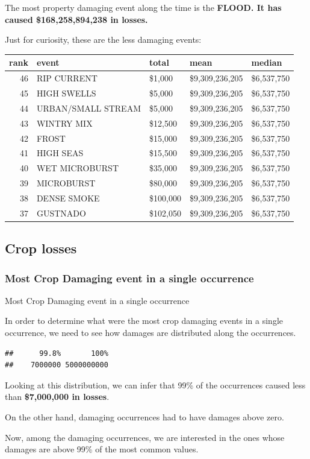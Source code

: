 \documentclass[]{article}
\begin{document}
The most property damaging event along the time is the \textbf{FLOOD. It
has caused \$168,258,894,238 in losses.}

Just for curiosity, these are the less damaging events:

\begin{longtable}[]{@{}rllll@{}}
\toprule
rank & event & total & mean & median\tabularnewline
\midrule
\endhead
46 & RIP CURRENT & \$1,000 & \$9,309,236,205 &
\$6,537,750\tabularnewline
45 & HIGH SWELLS & \$5,000 & \$9,309,236,205 &
\$6,537,750\tabularnewline
44 & URBAN/SMALL STREAM & \$5,000 & \$9,309,236,205 &
\$6,537,750\tabularnewline
43 & WINTRY MIX & \$12,500 & \$9,309,236,205 &
\$6,537,750\tabularnewline
42 & FROST & \$15,000 & \$9,309,236,205 & \$6,537,750\tabularnewline
41 & HIGH SEAS & \$15,500 & \$9,309,236,205 & \$6,537,750\tabularnewline
40 & WET MICROBURST & \$35,000 & \$9,309,236,205 &
\$6,537,750\tabularnewline
39 & MICROBURST & \$80,000 & \$9,309,236,205 &
\$6,537,750\tabularnewline
38 & DENSE SMOKE & \$100,000 & \$9,309,236,205 &
\$6,537,750\tabularnewline
37 & GUSTNADO & \$102,050 & \$9,309,236,205 & \$6,537,750\tabularnewline
\bottomrule
\end{longtable}

\subsection{Crop losses}\label{crop-losses}

\subsubsection{Most Crop Damaging event in a single
occurrence}\label{most-crop-damaging-event-in-a-single-occurrence}

Most Crop Damaging event in a single occurrence

In order to determine what were the most crop damaging events in a
single occurrence, we need to see how damages are distributed along the
occurrences.

\begin{verbatim}
##      99.8%       100% 
##    7000000 5000000000
\end{verbatim}

Looking at this distribution, we can infer that 99\% of the occurrences
caused less than \textbf{\$7,000,000 in losses}.

On the other hand, damaging occurrences had to have damages above zero.

Now, among the damaging occurrences, we are interested in the ones whose
damages are above 99\% of the most common values.
\end{document}
